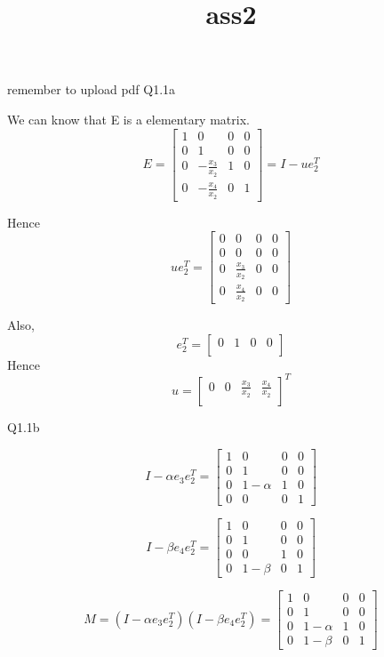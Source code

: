 \documentclass[11pt]{article}
\title{ass2}
\begin{document}
    
    
    \maketitle
    
    

    
    remember to upload pdf Q1.1a

We can know that E is a elementary matrix. \[
E=\left[\begin{array}{cccc}
1 & 0 & 0 & 0\\
0 & 1 & 0 & 0\\
0 & {-\frac{x_3}{x_2}} & 1 & 0\\
0 & {-\frac{x_4}{x_2}} & 0 & 1
\end{array}\right]=I-ue_2^{T}
\]

Hence \[
ue_2^{T}=\left[\begin{array}{cccc}
0 & 0 & 0 & 0\\
0 & 0 & 0 & 0\\
0 & \frac{x_3}{x_2} & 0 & 0\\
0 & \frac{x_4}{x_2} & 0 & 0
\end{array}\right]
\]

Also, \[
e_2^{T}=\left[\begin{array}{cccc}
0 & 1 & 0 & 0\\
\end{array}\right]
\] Hence \[u=\left[\begin{array}{cccc}
0 & 0 & \frac{x_3}{x_2} & \frac{x_4}{x_2}\\
\end{array}\right]^T\]

    Q1.1b

\[
I-\alpha e_3e_2^{T}=\left[\begin{array}{cccc}
1 & 0 & 0 & 0\\
0 & 1 & 0 & 0\\
0 & 1-\alpha & 1 & 0\\
0 & 0 & 0 & 1
\end{array}\right]
\]

\[
I-\beta e_4e_2^{T}=\left[\begin{array}{cccc}
1 & 0 & 0 & 0\\
0 & 1 & 0 & 0\\
0 & 0 & 1 & 0\\
0 & 1-\beta & 0 & 1
\end{array}\right]
\]

\[
M=(I-\alpha e_3e_2^{T})(I-\beta e_4e_2^{T})=\left[\begin{array}{cccc}
1 & 0 & 0 & 0\\
0 & 1 & 0 & 0\\
0 & 1-\alpha & 1 & 0\\
0 & 1-\beta & 0 & 1
\end{array}\right]
\]
\end{document}
